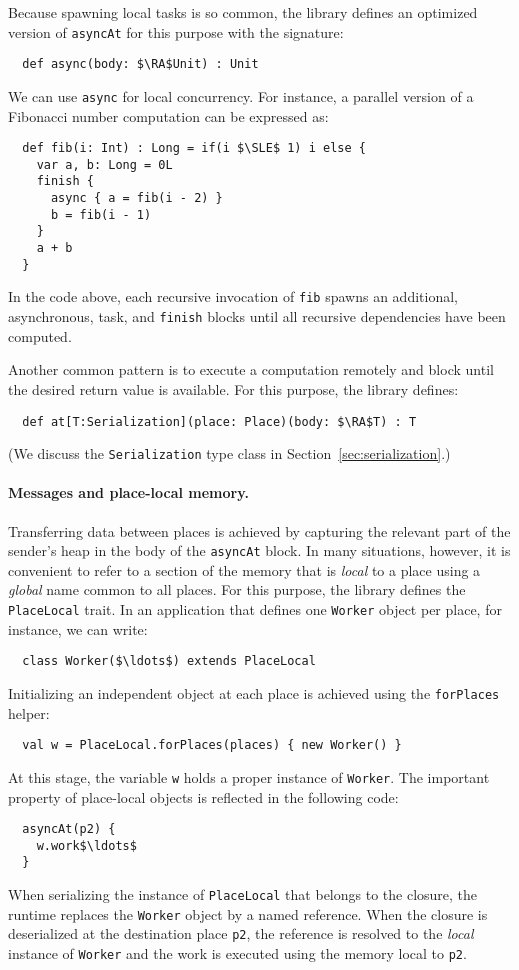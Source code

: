 Because spawning local tasks is so common, the library defines an optimized version of
\lstinline{asyncAt} for this purpose with the signature:
\begin{lstlisting}
  def async(body: $\RA$Unit) : Unit
\end{lstlisting}
We can use \lstinline{async} for local concurrency. For instance, a parallel
version of a Fibonacci number computation can be expressed as:
\begin{lstlisting}
  def fib(i: Int) : Long = if(i $\SLE$ 1) i else {
    var a, b: Long = 0L
    finish {
      async { a = fib(i - 2) }
      b = fib(i - 1)
    }
    a + b
  }
\end{lstlisting}
In the code above, each recursive invocation of \lstinline{fib} spawns an
additional, asynchronous, task, and \lstinline{finish} blocks until all
recursive dependencies have been computed.

Another common pattern is to execute a computation remotely and block until the
desired return value is available. For this purpose, the library defines:
\begin{lstlisting}
  def at[T:Serialization](place: Place)(body: $\RA$T) : T
\end{lstlisting}
(We discuss the \lstinline{Serialization} type class in
Section~\ref{sec:serialization}.)

\paragraph{Messages and place-local memory.}

Transferring data between places is achieved by capturing the relevant part of
the sender's heap in the body of the \lstinline{asyncAt} block. In many
situations, however, it is convenient to refer to a section of the memory that
is \emph{local} to a place using a \emph{global} name common to all places. For this
purpose, the library defines the \lstinline{PlaceLocal} trait. In an
application that defines one \lstinline{Worker} object per place, for instance,
we can write:
\begin{lstlisting}
  class Worker($\ldots$) extends PlaceLocal
\end{lstlisting}
Initializing an independent object at each place is achieved using the
\lstinline{forPlaces} helper:
\begin{lstlisting}
  val w = PlaceLocal.forPlaces(places) { new Worker() }
\end{lstlisting}
At this stage, the variable \lstinline{w} holds a proper instance of
\lstinline{Worker}. The important property of place-local objects is reflected
in the following code:
\begin{lstlisting}
  asyncAt(p2) {
    w.work$\ldots$
  }
\end{lstlisting}
When serializing the instance of \lstinline{PlaceLocal} that belongs to the
closure, the runtime replaces the \lstinline{Worker} object by a named
reference. When the closure is deserialized at the destination place
\lstinline{p2}, the reference is resolved to the \emph{local} instance of
\lstinline{Worker} and the work is executed using the memory local to
\lstinline{p2}.


